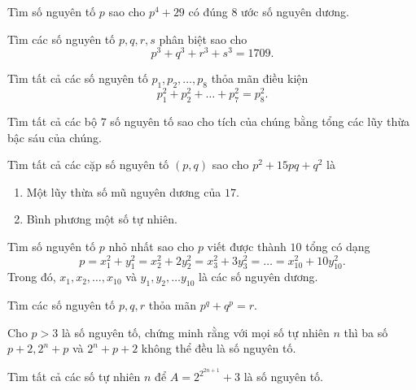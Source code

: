 \begin{btt}
Tìm số nguyên tố $p$ sao cho $p^4+29$ có đúng $8$ ước số nguyên dương.
\end{btt}

\begin{btt}
Tìm các số nguyên tố $p,q,r,s$ phân biệt sao cho \[p^3+q^3+r^3+s^3=1709.\]  
\end{btt}

\begin{btt}
Tìm tất cả các số nguyên tố $p_1,p_2,\ldots,p_8$ thỏa mãn điều kiện
\[p^2_1+p^2_2+\ldots +p^2_7=p^2_8.\]
\end{btt}

\begin{btt}
Tìm tất cả các bộ $7$ số nguyên tố sao cho tích của chúng bằng tổng các lũy thừa bậc sáu của chúng.

\end{btt}

\begin{btt}
Tìm tất cả các cặp số nguyên tố $(p,q)$ sao cho $p^2+15pq+q^2$ là
\begin{enumerate}[a,]
	\item Một lũy thừa số mũ nguyên dương của $17.$
	\item Bình phương một số tự nhiên.
\end{enumerate}
\end{btt}

\begin{btt}
Tìm số nguyên tố $p$ nhỏ nhất sao cho $p$ viết được thành $10$ tổng có dạng
$$p=x_1^2+y_1^2=x_{2}^{2}+2 y_{2}^{2}=x_{3}^{2}+3 y_{3}^{2}=\ldots=x_{10}^{2}+10 y_{10}^{2}.$$ 
Trong đó, $x_1,x_2, \ldots , x_{10}$ và $y_1, y_2, \ldots y_{10}$ là các số nguyên dương. 
\end{btt}

\begin{btt}
Tìm các số nguyên tố $p,q,r$ thỏa mãn $p^q+q^p=r.$ 
\end{btt}

\begin{btt}
Cho $p>3$ là số nguyên tố, chứng minh rằng với mọi số tự nhiên $n$ thì ba số $p+2,2^{n}+p$ và $2^{n}+p+2$ không thể đều là số nguyên tố.
\end{btt}

\begin{btt}
Tìm tất cả các số tự nhiên $n$ để $A=2^{2^{2n+1}}+3$ là số nguyên tố.
\end{btt}

